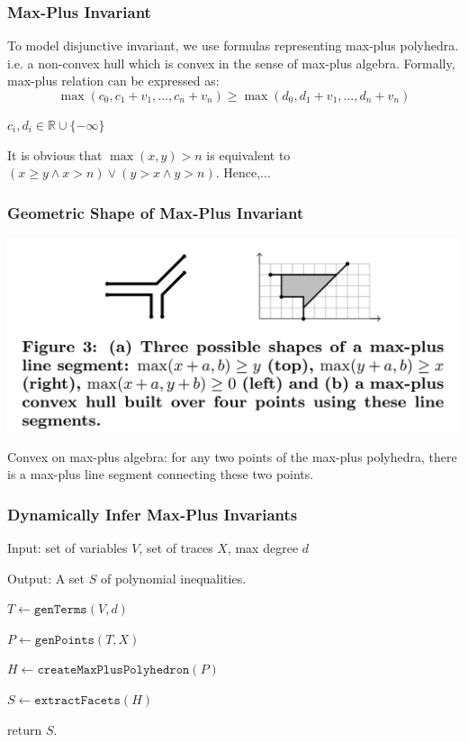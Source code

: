 \documentclass[11pt]{beamer}
\begin{document}
\begin{frame}\frametitle{Max-Plus Invariant}
To model disjunctive invariant, we use formulas representing max-plus polyhedra. i.e. a non-convex hull which is convex in the sense of max-plus algebra. Formally, max-plus relation can be expressed as:
\[\max(c_0, c_1 + v_1, \ldots, c_n + v_n) \ge \max(d_0, d_1 + v_1, \ldots, d_n + v_n)\]

$c_i, d_i\in \mathbb{R} \cup \{-\infty\}$

It is obvious that $\max(x, y) > n$ is equivalent to $(x \ge y \wedge x > n )\vee (y > x \wedge y > n)$. Hence,...
\end{frame}

\begin{frame}\frametitle{Geometric Shape of Max-Plus Invariant}
\begin{center}
\includegraphics[scale=0.27]{3.png}
\end{center}
Convex on max-plus algebra: for any two points of the max-plus polyhedra, there is a max-plus line segment connecting these two points.
\end{frame}

\begin{frame}\frametitle{Dynamically Infer Max-Plus Invariants }
Input: set of variables $V$, set of traces $X$, max degree $d$

Output: A set $S$ of polynomial inequalities.

$T \leftarrow \texttt{genTerms}(V,d)$

$P \leftarrow \texttt{genPoints}(T,X)$

$H \leftarrow \texttt{createMaxPlusPolyhedron}(P)$

$S\leftarrow \texttt{extractFacets}(H)$

return $S$.
\end{frame}
\end{document}
